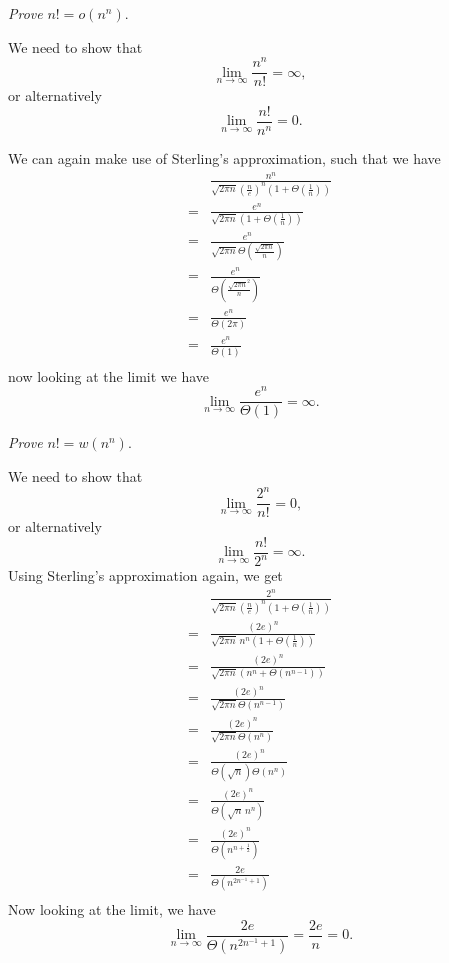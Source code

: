 \documentclass[11pt]{article}
\numberwithin{equation}{section}
\begin{document}
\textit{Prove} $n! = o(n^n)$.

We need to show that
\[
    \lim_{n \to \infty} \frac{n^n}{n!} = \infty,
\]
or alternatively 
\[
    \lim_{n \to \infty} \frac{n!}{n^n} = 0.
\]

We can again make use of Sterling's approximation, such that we have
\[
\begin{split}
    & \frac{n^n}{\sqrt{2\pi n} {\left(\frac{n}{e}\right)}^n 
            \left(1+\Theta(\frac{1}{n})\right)} \\
    =& \frac{e^n}{\sqrt{2\pi n} \left(1+\Theta \left(\frac{1}{n}\right)\right)} \\
    =& \frac{e^n}{\sqrt{2\pi n} \Theta\left(\frac{\sqrt{2\pi n}}{n}\right)} \\
    =& \frac{e^n}{\Theta\left(\frac{{\sqrt{2\pi n}}^2}{n}\right)} \\
    =& \frac{e^n}{\Theta (2 \pi)} \\
    =& \frac{e^n}{\Theta (1)} \\
\end{split}
\]
now looking at the limit we have
\[
    \lim_{n \to \infty} \frac{e^n}{\Theta (1)} = \infty.
\]

\pagebreak
\textit{Prove} $n! = w(n^n)$.

We need to show that
\[
    \lim_{n \to \infty} \frac{2^n}{n!} = 0,
\]
or alternatively 
\[
    \lim_{n \to \infty} \frac{n!}{2^n} = \infty.
\]
Using Sterling's approximation again, we get 
\[
\begin{split}
    & \frac{2^n} {\sqrt{2\pi n}{\left(\frac{n}{e}\right)}^n 
            \left(1+\Theta(\frac{1}{n})\right)} \\
    =& \frac{{(2e)}^n} {\sqrt{2\pi n} \, n^n
            \left(1+\Theta(\frac{1}{n})\right)} \\
    =& \frac{{(2e)}^n} {\sqrt{2\pi n} \left( n^n + \Theta(n^{n-1})\right)} \\
    =& \frac{{(2e)}^n} {\sqrt{2\pi n} \Theta(n^{n-1})} \\
    =& \frac{{(2e)}^n} {\sqrt{2\pi n} \Theta(n^{n})} \\
    =& \frac{{(2e)}^n} {\Theta(\sqrt{n}) \Theta(n^{n})} \\
    =& \frac{{(2e)}^n} {\Theta(\sqrt{n} \, n^{n})} \\
    =& \frac{{(2e)}^n} {\Theta(n^{n + \frac{1}{2}})} \\
    =& \frac{2e} {\Theta(n^{2n^{-1} + 1})} \\
\end{split}
\]
Now looking at the limit, we have
\[
    \lim_{n\to\infty} \frac{2e}{\Theta(n^{2n^{-1}+1})} = \frac{2e}{n} = 0.
\]
\end{document}

